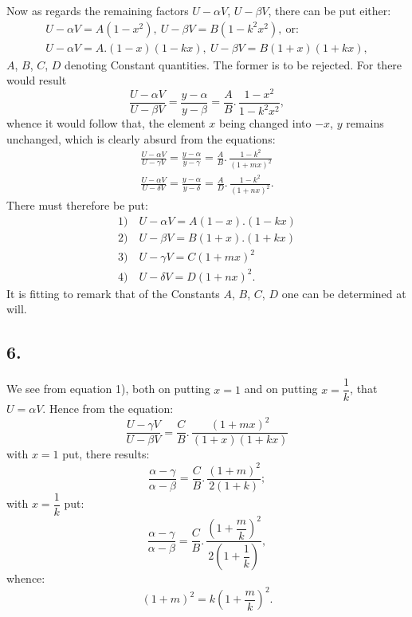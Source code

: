 \documentclass{article}
\begin{document}
Now as regards the remaining factors $U-\alpha V$, $U-\beta V$, there can be put either:
\[
\begin{gathered}
U-\alpha V=A(1-x^{2}),\ U-\beta V=B(1-k^{2}x^{2}),\ \text{or:}\\
U-\alpha V=A.(1-x)(1-kx),\ U-\beta V=B(1+x)(1+kx),
\end{gathered}
\]
$A$, $B$, $C$, $D$ denoting Constant quantities. The former is to be rejected. For there would result
\[
\frac{U-\alpha V}{U-\beta V}=\frac{y-\alpha}{y-\beta}=\frac{A}{B}.\,\frac{1-x^{2}}{1-k^{2}x^{2}},
\]
whence it would follow that, the element $x$ being changed into $-x$, $y$ remains unchanged, which is clearly absurd from the equations:
\[
\begin{gathered}
\frac{U-\alpha V}{U-\gamma V}=\frac{y-\alpha}{y-\gamma}=\frac{A}{B}.\,\frac{1-k^{2}}{(1+mx)^{2}}\\
\frac{U-\alpha V}{U-\delta V}=\frac{y-\alpha}{y-\delta}=\frac{A}{D}.\,\frac{1-k^{2}}{(1+nx)^{2}}.
\end{gathered}
\]
There must therefore be put:
\[
\begin{gathered}
\text{1)}\quad U-\alpha V=A(1-x).(1-kx)\\
\text{2)}\quad U-\beta V=B(1+x).(1+kx)\\
\text{3)}\quad U-\gamma V=C(1+mx)^{2}\\
\text{4)}\quad U-\delta V=D(1+nx)^{2}.
\end{gathered}
\]
It is fitting to remark that of the Constants $A$, $B$, $C$, $D$ one can be determined at will.

\subsection*{6.}

We see from equation 1), both on putting $x=1$ and on putting $x=\dfrac{1}{k}$, that $U=\alpha V$. Hence from the equation:
\[
\frac{U-\gamma V}{U-\beta V}=\frac{C}{B}.\,\frac{(1+mx)^{2}}{(1+x)(1+kx)}
\]
with $x=1$ put, there results:
\[
\frac{\alpha-\gamma}{\alpha-\beta}=\frac{C}{B}.\,\frac{(1+m)^{2}}{2(1+k)};
\]
with $x=\dfrac{1}{k}$ put:
\[
\frac{\alpha-\gamma}{\alpha-\beta}=\frac{C}{B}.\,\frac{\left(1+\dfrac{m}{k}\right)^{2}}{2\left(1+\dfrac{1}{k}\right)},
\]
whence:
\[
(1+m)^{2}=k\left(1+\frac{m}{k}\right)^{2}.
\]
\end{document}
